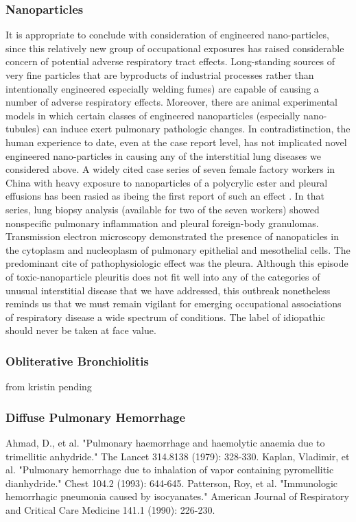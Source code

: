 \documentclass[a4paper,12pt]{article}
\begin{document}
\subsubsection{Nanoparticles}
It is appropriate to conclude with consideration of engineered nano-particles, since this relatively new group of occupational exposures has raised considerable concern of potential adverse respiratory tract effects. Long-standing sources of very fine particles that are byproducts of industrial processes rather than intentionally engineered especially welding fumes) are capable of causing a number of adverse respiratory effects. Moreover, there are animal experimental models in which certain classes of engineered nanoparticles (especially nano-tubules) can induce exert pulmonary pathologic changes. In contradistinction, the human experience to date, even at the case report level, has not implicated novel engineered nano-particles in causing any of the interstitial lung diseases we considered above.   A widely cited case series of seven female factory workers in China with heavy exposure to nanoparticles of a polycrylic ester and pleural effusions has been rasied as ibeing the first report of such an effect \cite{Song2009}. In that series, lung biopsy analysis (available for two of the seven workers) showed nonspecific pulmonary inflammation and pleural foreign-body granulomas. Transmission electron microscopy demonstrated the presence of nanopaticles in the cytoplasm and nucleoplasm of pulmonary epithelial and mesothelial cells. The predominant cite of pathophysiologic effect was the pleura. Although this episode of toxic-nanoparticle pleuritis does not fit well into any of the categories of unusual interstitial disease that we have addressed, this outbreak nonetheless reminds us that we must remain vigilant for emerging occupational associations of respiratory disease a wide spectrum of conditions. The label of idiopathic should never be taken at face value.

\subsubsection{Obliterative Bronchiolitis}
from kristin pending

\subsubsection{Diffuse Pulmonary Hemorrhage}
Ahmad, D., et al. "Pulmonary haemorrhage and haemolytic anaemia due to trimellitic anhydride." The Lancet 314.8138 (1979): 328-330.
Kaplan, Vladimir, et al. "Pulmonary hemorrhage due to inhalation of vapor containing pyromellitic dianhydride." Chest 104.2 (1993): 644-645.
Patterson, Roy, et al. "Immunologic hemorrhagic pneumonia caused by isocyanates." American Journal of Respiratory and Critical Care Medicine 141.1 (1990): 226-230.
\end{document}
